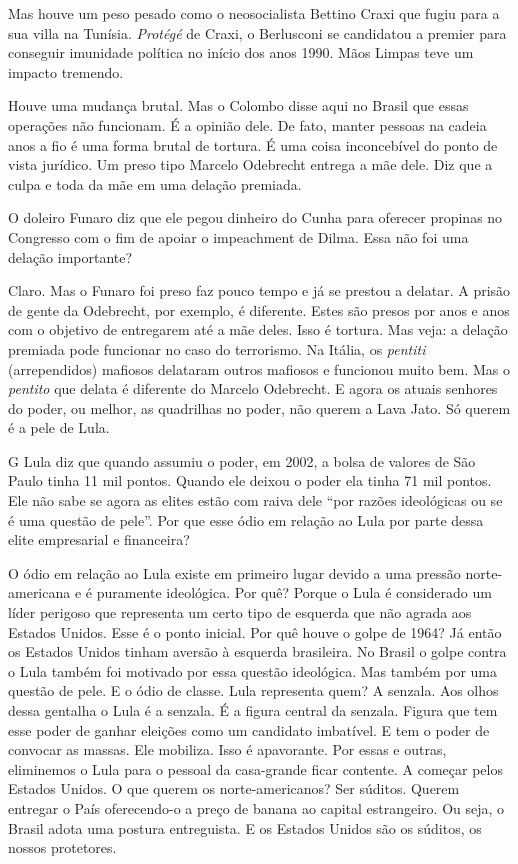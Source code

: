 \falaG Mas houve um peso pesado como o neosocialista Bettino Craxi que fugiu
para a sua villa na Tunísia. \emph{Protégé} de Craxi, o Berlusconi se
candidatou a premier para conseguir imunidade política no início dos
anos 1990. Mãos Limpas teve um impacto tremendo.

\falaM Houve uma mudança brutal. Mas o Colombo disse aqui no Brasil que
essas operações não funcionam. É a opinião dele. De fato, manter pessoas
na cadeia anos a fio é uma forma brutal de tortura. É uma coisa
inconcebível do ponto de vista jurídico. Um preso tipo Marcelo Odebrecht
entrega a mãe dele. Diz que a culpa e toda da mãe em uma delação
premiada.

\falaG O doleiro Funaro diz que ele pegou dinheiro do Cunha para oferecer
propinas no Congresso com o fim de apoiar o impeachment de Dilma. Essa
não foi uma delação importante?

\falaM Claro. Mas o Funaro foi preso faz pouco tempo e já se prestou a
delatar. A prisão de gente da Odebrecht, por exemplo, é diferente. Estes
são presos por anos e anos com o objetivo de entregarem até a mãe deles.
Isso é tortura. Mas veja: a delação premiada pode funcionar no caso do
terrorismo. Na Itália, os \emph{pentiti} (arrependidos) mafiosos
delataram outros mafiosos e funcionou muito bem. Mas o \emph{pentito}
que delata é diferente do Marcelo Odebrecht. E agora os atuais senhores
do poder, ou melhor, as quadrilhas no poder, não querem a Lava Jato. Só
querem é a pele de Lula.

G Lula diz que quando assumiu o poder, em 2002, a bolsa de valores de
São Paulo tinha 11 mil pontos. Quando ele deixou o poder ela tinha 71
mil pontos. Ele não sabe se agora as elites estão com raiva dele ``por
razões ideológicas ou se é uma questão de pele''. Por que esse ódio em
relação ao Lula por parte dessa elite empresarial e financeira?

\falaM O ódio em relação ao Lula existe em primeiro lugar devido a uma
pressão norte-americana e é puramente ideológica.
Por quê? Porque o Lula é
considerado um líder perigoso que representa um certo tipo de esquerda
que não agrada aos Estados Unidos. Esse é o ponto inicial. Por quê houve
o golpe de 1964? Já então os Estados Unidos tinham aversão à esquerda
brasileira. No Brasil o golpe contra o Lula também foi motivado por essa
questão ideológica. Mas também por uma questão de pele. E o ódio de
classe. Lula representa quem? A senzala. Aos olhos dessa gentalha o Lula
é a senzala. É a figura central da senzala. Figura que tem esse poder de
ganhar eleições como um candidato imbatível. E tem o poder de convocar
as massas. Ele mobiliza. Isso é apavorante. Por essas e outras,
eliminemos o Lula para o pessoal da casa-grande ficar contente. A
começar pelos Estados Unidos. O que querem os norte-americanos? Ser
súditos. Querem entregar o País oferecendo-o a preço de banana ao
capital estrangeiro. Ou seja, o Brasil adota uma postura entreguista. E
os Estados Unidos são os súditos, os nossos protetores.


